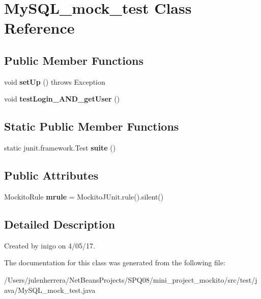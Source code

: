 \hypertarget{class_my_s_q_l__mock__test}{}\section{My\+S\+Q\+L\+\_\+mock\+\_\+test Class Reference}
\label{class_my_s_q_l__mock__test}
\subsection*{Public Member Functions}
\begin{DoxyCompactItemize}
\item 
\mbox{\label{class_my_s_q_l__mock__test_a62ed0bf5185a7f6fff7287d9d538680a}} 
void {\bfseries set\+Up} ()  throws Exception 
\item 
\mbox{\label{class_my_s_q_l__mock__test_a8a12b33cee07a8561a599e757da0de08}} 
void {\bfseries test\+Login\+\_\+\+A\+N\+D\+\_\+get\+User} ()
\end{DoxyCompactItemize}
\subsection*{Static Public Member Functions}
\begin{DoxyCompactItemize}
\item 
\mbox{\label{class_my_s_q_l__mock__test_a2a77df269b4a8815401454a8032f2647}} 
static junit.\+framework.\+Test {\bfseries suite} ()
\end{DoxyCompactItemize}
\subsection*{Public Attributes}
\begin{DoxyCompactItemize}
\item 
\mbox{\label{class_my_s_q_l__mock__test_a3a9026298f5078cb08c6d3f8ccc613cc}} 
Mockito\+Rule {\bfseries mrule} = Mockito\+J\+Unit.\+rule().silent()
\end{DoxyCompactItemize}


\subsection{Detailed Description}
Created by inigo on 4/05/17. 

The documentation for this class was generated from the following file\+:\begin{DoxyCompactItemize}
\item 
/\+Users/julenherrera/\+Net\+Beans\+Projects/\+S\+P\+Q08/mini\+\_\+project\+\_\+mockito/src/test/java/My\+S\+Q\+L\+\_\+mock\+\_\+test.\+java\end{DoxyCompactItemize}
